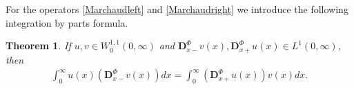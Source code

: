 \documentclass[11pt,a4paper]{article}
\theoremstyle{plain}
\newtheorem{theorem}{Theorem}[section]
\theoremstyle{definition}
\theoremstyle{remark}
\begin{document}
		For the operators \eqref{Marchaudleft} and \eqref{Marchaudright} we introduce the following integration by parts formula.
		\begin{theorem}
			If $u,v \in W_0^{1,1}(0,\infty)$ and $\mathbf{D}_{x-}^\Phi v(x),\mathbf{D}_{x+}^\Phi u(x) \in L^1(0,\infty)$, then
			\begin{align}
				\label{MarchaudAdjoint}
				\int_{0}^\infty u(x) \left(\mathbf{D}_{x-}^\Phi v(x)\right) dx=\int_{0}^\infty \left(\mathbf{D}_{x+}^\Phi u(x)\right)v(x) dx.
			\end{align}
		\end{theorem}
\end{document}

